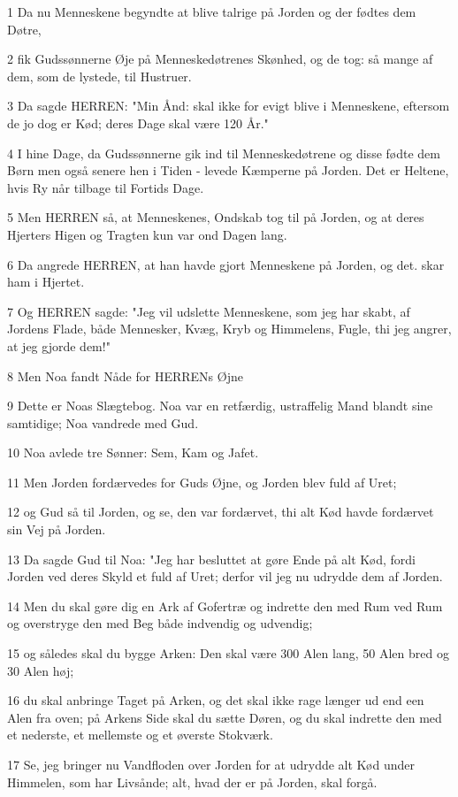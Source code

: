 \par 1 Da nu Menneskene begyndte at blive talrige på Jorden og der fødtes dem Døtre,
\par 2 fik Gudssønnerne Øje på Menneskedøtrenes Skønhed, og de tog: så mange af dem, som de lystede, til Hustruer.
\par 3 Da sagde HERREN: "Min Ånd: skal ikke for evigt blive i Menneskene, eftersom de jo dog er Kød; deres Dage skal være 120 År."
\par 4 I hine Dage, da Gudssønnerne gik ind til Menneskedøtrene og disse fødte dem Børn men også senere hen i Tiden - levede Kæmperne på Jorden. Det er Heltene, hvis Ry når tilbage til Fortids Dage.
\par 5 Men HERREN så, at Menneskenes, Ondskab tog til på Jorden, og at deres Hjerters Higen og Tragten kun var ond Dagen lang.
\par 6 Da angrede HERREN, at han havde gjort Menneskene på Jorden, og det. skar ham i Hjertet.
\par 7 Og HERREN sagde: "Jeg vil udslette Menneskene, som jeg har skabt, af Jordens Flade, både Mennesker, Kvæg, Kryb og Himmelens, Fugle, thi jeg angrer, at jeg gjorde dem!"
\par 8 Men Noa fandt Nåde for HERRENs Øjne
\par 9 Dette er Noas Slægtebog. Noa var en retfærdig, ustraffelig Mand blandt sine samtidige; Noa vandrede med Gud.
\par 10 Noa avlede tre Sønner: Sem, Kam og Jafet.
\par 11 Men Jorden fordærvedes for Guds Øjne, og Jorden blev fuld af Uret;
\par 12 og Gud så til Jorden, og se, den var fordærvet, thi alt Kød havde fordærvet sin Vej på Jorden.
\par 13 Da sagde Gud til Noa: "Jeg har besluttet at gøre Ende på alt Kød, fordi Jorden ved deres Skyld et fuld af Uret; derfor vil jeg nu udrydde dem af Jorden.
\par 14 Men du skal gøre dig en Ark af Gofertræ og indrette den med Rum ved Rum og overstryge den med Beg både indvendig og udvendig;
\par 15 og således skal du bygge Arken: Den skal være 300 Alen lang, 50 Alen bred og 30 Alen høj;
\par 16 du skal anbringe Taget på Arken, og det skal ikke rage længer ud end een Alen fra oven; på Arkens Side skal du sætte Døren, og du skal indrette den med et nederste, et mellemste og et øverste Stokværk.
\par 17 Se, jeg bringer nu Vandfloden over Jorden for at udrydde alt Kød under Himmelen, som har Livsånde; alt, hvad der er på Jorden, skal forgå.
